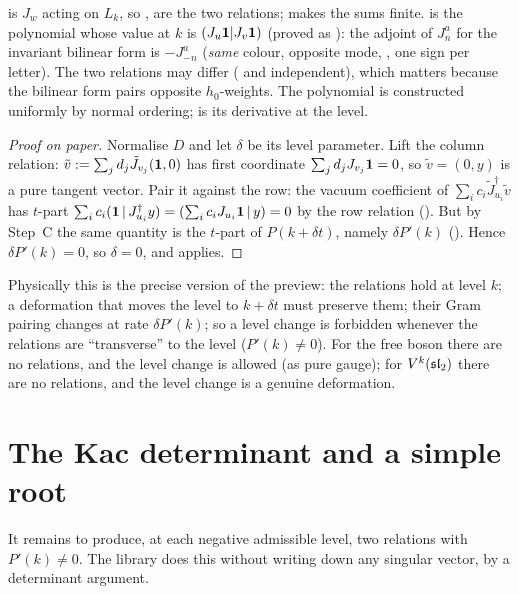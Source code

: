 \begin{dictionary}
 is $J_w$ acting on $L_k$, so ,  are the two relations;
 makes the sums finite.  is the polynomial whose value
at $k$ is $(J_u\mathbf{1}|J_v\mathbf{1})$ (proved as ): the adjoint of
$J^a_n$ for the invariant bilinear form is $-J^a_{-n}$ (\emph{same} colour, opposite mode,
, one sign per letter). The two relations may differ ( and 
independent), which matters because the bilinear form pairs opposite $h_0$-weights. The polynomial
is constructed uniformly by normal ordering;  is its derivative at the level.
\end{dictionary}

\begin{proof}[Proof on paper]
Normalise $D$ and let $\delta$ be its level parameter. Lift the column relation:
$\tilde v := \sum_jd_j\tilde J_{v_j}(\mathbf{1},0)$ has first coordinate $\sum_jd_jJ_{v_j}\mathbf{1} = 0$, so
$\tilde v = (0,y)$ is a pure tangent vector. Pair it against the row: the vacuum coefficient of
$\sum_ic_i\tilde J_{u_i}^{\dagger}\tilde v$ has $t$-part $\sum_ic_i(\mathbf{1}\,|\,J_{u_i}^\dagger y) =
(\sum_ic_iJ_{u_i}\mathbf{1}\,|\,y) = 0$ by the row relation (). But by
Step~C the same quantity is the $t$-part of $P(k+\delta t)$, namely $\delta P'(k)$
(). Hence $\delta P'(k) = 0$, so $\delta = 0$, and
 applies.
\end{proof}

Physically this is the precise version of the preview: the relations hold at level $k$; a
deformation that moves the level to $k+\delta t$ must preserve them; their Gram pairing changes at
rate $\delta P'(k)$; so a level change is forbidden whenever the relations are ``transverse'' to the
level ($P'(k)\neq0$). For the free boson there are no relations, and the level change is allowed (as
pure gauge); for $V^k(\mathfrak{sl}_2)$ there are no relations, and the level change is a genuine deformation.

\section{The Kac determinant and a simple root}\label{l09:sec:determinant}

It remains to produce, at each negative admissible level, two relations with $P'(k)\ne0$. The library
does this without writing down any singular vector, by a determinant argument.

